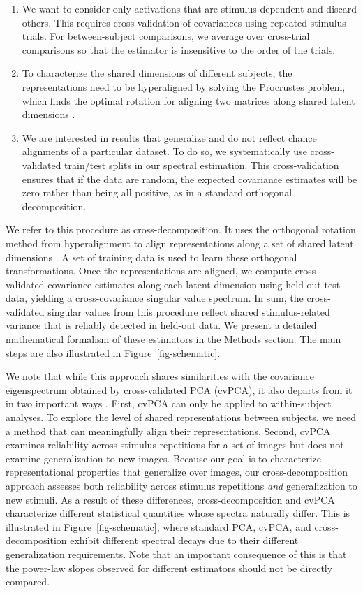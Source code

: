 \documentclass[10pt]{article}
\begin{document}
\begin{enumerate}
\def\labelenumi{\arabic{enumi}.}
\tightlist
\item
  We want to consider only activations that are stimulus-dependent and
  discard others. This requires cross-validation of covariances using
  repeated stimulus trials. For between-subject comparisons, we average
  over cross-trial comparisons so that the estimator is insensitive to
  the order of the trials.
\item
  To characterize the shared dimensions of different subjects, the
  representations need to be hyperaligned by solving the Procrustes
  problem, which finds the optimal rotation for aligning two matrices
  along shared latent dimensions \autocite{Haxby2011}.
\item
  We are interested in results that generalize and do not reflect chance
  alignments of a particular dataset. To do so, we systematically use
  cross-validated train/test splits in our spectral estimation. This
  cross-validation ensures that if the data are random, the expected
  covariance estimates will be zero rather than being all positive, as
  in a standard orthogonal decomposition.
\end{enumerate}

We refer to this procedure as cross-decomposition. It uses the
orthogonal rotation method from hyperalignment to align representations
along a set of shared latent dimensions \autocite{Haxby2011}. A set of
training data is used to learn these orthogonal transformations. Once
the representations are aligned, we compute cross-validated covariance
estimates along each latent dimension using held-out test data, yielding
a cross-covariance singular value spectrum. In sum, the cross-validated
singular values from this procedure reflect shared stimulus-related
variance that is reliably detected in held-out data. We present a
detailed mathematical formalism of these estimators in the Methods
section. The main steps are also illustrated in
Figure~\ref{fig-schematic}.

We note that while this approach shares similarities with the covariance
eigenspectrum obtained by cross-validated PCA (cvPCA), it also departs
from it in two important ways \autocite{Stringer2019}. First, cvPCA can
only be applied to within-subject analyses. To explore the level of
shared representations between subjects, we need a method that can
meaningfully align their representations. Second, cvPCA examines
reliability across stimulus repetitions for a set of images but does not
examine generalization to new images. Because our goal is to
characterize representational properties that generalize over images,
our cross-decomposition approach assesses both reliability across
stimulus repetitions \emph{and} generalization to new stimuli. As a
result of these differences, cross-decomposition and cvPCA characterize
different statistical quantities whose spectra naturally differ. This is
illustrated in Figure~\ref{fig-schematic}, where standard PCA, cvPCA,
and cross-decomposition exhibit different spectral decays due to their
different generalization requirements. Note that an important
consequence of this is that the power-law slopes observed for different
estimators should not be directly compared.
\end{document}

